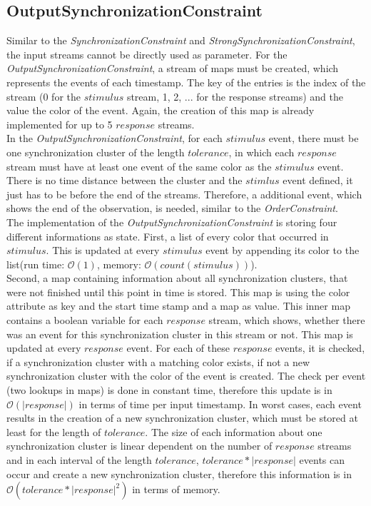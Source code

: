 \subsection{OutputSynchronizationConstraint}
	Similar to the \emph{SynchronizationConstraint} and \emph{StrongSynchronizationConstraint}, the input streams cannot be directly used as parameter. For the \emph{OutputSynchronizationConstraint}, a stream of maps must be created, which represents the events of each timestamp. The key of the entries is the index of the stream (0 for the $stimulus$ stream, 1, 2, ... for the response streams) and the value the color of the event. Again, the creation of this map is already implemented for up to 5 $response$ streams.\\
	In the \emph{OutputSynchronizationConstraint}, for each $stimulus$ event, there must be one synchronization cluster of the length $tolerance$, in which each $response$ stream must have at least one event of the same color as the $stimulus$ event. There is no time distance between the cluster and the $stimlus$ event defined, it just has to be before the end of the streams. Therefore, a additional event, which shows the end of the observation, is needed, similar to the \emph{OrderConstraint}.\\
	The implementation of the \emph{OutputSynchronizationConstraint} is storing four different informations as state. First, a list of every color that occurred in $stimulus$. This is updated at every $stimulus$ event by appending its color to the list(run time: $\mathcal{O}(1)$, memory: $\mathcal{O}(count(stimulus))$).\\
	Second, a map containing information about all synchronization clusters, that were not finished until this point in time is stored. This map is using the color attribute as key and the start time stamp and a map as value. This inner map contains a boolean variable for each $response$ stream, which shows, whether there was an event for this synchronization cluster in this stream or not. This map is updated at every $response$ event. For each of these $response$ events, it is checked, if a synchronization cluster with a matching color exists, if not a new synchronization cluster with the color of the event is created. The check per event (two lookups in maps)  is done in constant time, therefore this update is in $\mathcal{O}(|response|)$ in terms of time per input timestamp. In worst cases, each event results in the creation of a new synchronization cluster, which must be stored at least for the length of $tolerance$. The size of each information about one synchronization cluster is linear dependent on the number of $response$ streams and in each interval of the length $tolerance$, $tolerance*|response|$ events can occur and create a new synchronization cluster, therefore this information is in $\mathcal{O}(tolerance*|response|^2)$ in terms of memory. 
